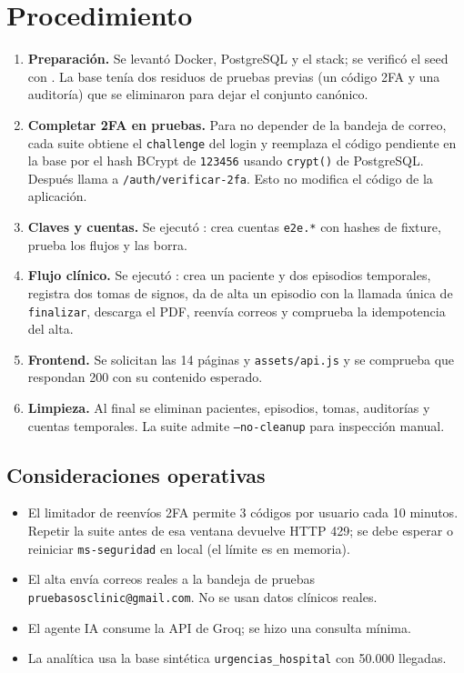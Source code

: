 \documentclass[11pt]{article}
\begin{document}
\section{Procedimiento}

\begin{enumerate}
  \item \textbf{Preparación.} Se levantó Docker, PostgreSQL y el stack; se
  verificó el seed con . La base
  tenía dos residuos de pruebas previas (un código 2FA y una auditoría) que se
  eliminaron para dejar el conjunto canónico.
  \item \textbf{Completar 2FA en pruebas.} Para no depender de la bandeja de
  correo, cada suite obtiene el \texttt{challenge} del login y reemplaza el
  código pendiente en la base por el hash BCrypt de \texttt{123456} usando
  \texttt{crypt()} de PostgreSQL. Después llama a
  \texttt{/auth/verificar-2fa}. Esto no modifica el código de la aplicación.
  \item \textbf{Claves y cuentas.} Se ejecutó : crea
  cuentas \texttt{e2e.*} con hashes de fixture, prueba los flujos y las borra.
  \item \textbf{Flujo clínico.} Se ejecutó : crea un
  paciente y dos episodios temporales, registra dos tomas de signos, da de alta
  un episodio con la llamada única de \texttt{finalizar}, descarga el PDF,
  reenvía correos y comprueba la idempotencia del alta.
  \item \textbf{Frontend.} Se solicitan las 14 páginas y \texttt{assets/api.js}
  y se comprueba que respondan 200 con su contenido esperado.
  \item \textbf{Limpieza.} Al final se eliminan pacientes, episodios, tomas,
  auditorías y cuentas temporales. La suite admite \texttt{--no-cleanup} para
  inspección manual.
\end{enumerate}

\subsection{Consideraciones operativas}

\begin{itemize}
  \item El limitador de reenvíos 2FA permite 3 códigos por usuario cada 10
  minutos. Repetir la suite antes de esa ventana devuelve HTTP 429; se debe
  esperar o reiniciar \texttt{ms-seguridad} en local (el límite es en memoria).
  \item El alta envía correos reales a la bandeja de pruebas
  \texttt{pruebasosclinic@gmail.com}. No se usan datos clínicos reales.
  \item El agente IA consume la API de Groq; se hizo una consulta mínima.
  \item La analítica usa la base sintética \texttt{urgencias\_hospital} con
  50.000 llegadas.
\end{itemize}
\end{document}
